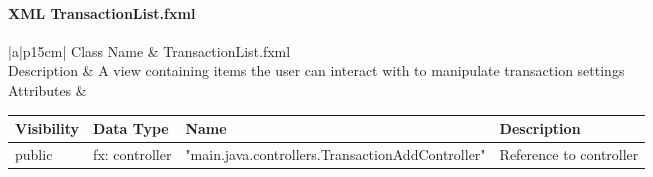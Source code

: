 \documentclass[12pt]{article}
\begin{document}
\paragraph{XML TransactionList.fxml}
\begin{table}[H]
	\begin{tabular}{|a|p{15cm}|}
		\hline
		{Class Name} & {TransactionList.fxml} \\
		\hline
		Description & A view containing items the user can interact with to manipulate transaction settings\\
		\hline
		Attributes & 
		\begin{tabular}{| p{1.5cm} | p{2.0cm} | p{6.5cm} | p{3.45cm} |}
			\hline
			\rowcolor{lightgray}
			Visibility & Data Type & Name & Description \\
			\hline
			\rowcolor{white}
			public & fx: controller & "main.java.controllers.TransactionAddController" & Reference to controller\\
			\hline
		\end{tabular} \\
		\hline								 
	\end{tabular}
\end{table}
\end{document}
